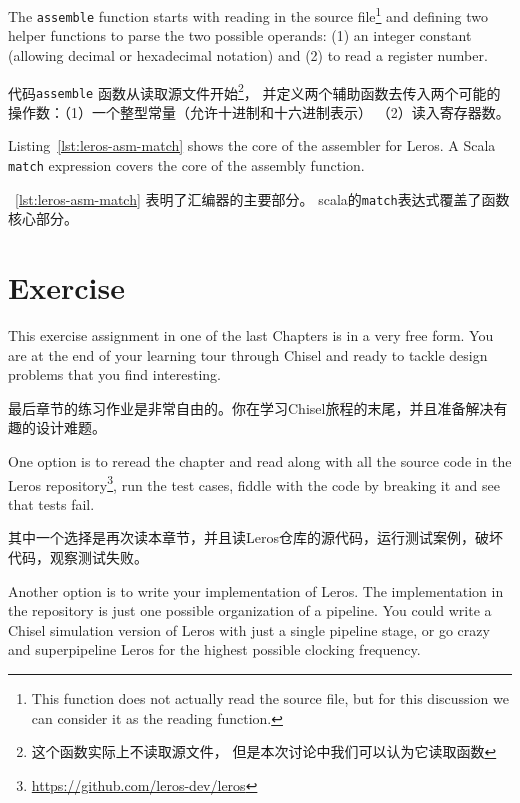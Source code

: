\documentclass[%
    10pt,
    headinclude, footexclude,
    openright, %
    notitlepage,
    cleardoubleempty,
    headsepline,
    pointlessnumbers,
    bibtotoc, idxtotoc,
    ]{scrbook}
\newcommand{\code}[1]{{\small{\texttt{#1}}}}
\newcommand{\todo}[1]{{\emph{TODO: #1}}}
\newcommand{\myref}[2]{\href{#1}{#2}}
\renewcommand{\myref}[2]{{#2}{\footnote{\url{#1}}}}
\renewcommand{\todo}[1]{}
\begin{document}
{The \code{assemble} function starts with reading in the source
file\footnote{This function does not actually read the source file, but for this
discussion we can consider it as the reading function.}
and defining two helper functions to parse the two possible operands: (1) an
integer constant (allowing decimal or hexadecimal notation) and (2) to read
a register number.

代码\code{assemble} 函数从读取源文件开始\footnote{这个函数实际上不读取源文件，
但是本次讨论中我们可以认为它读取函数}，
并定义两个辅助函数去传入两个可能的操作数：（1）一个整型常量（允许十进制和十六进制表示）
（2）读入寄存器数。


Listing~\ref{lst:leros-asm-match} shows the core of the assembler for Leros.
A Scala \code{match} expression covers the core of the assembly function.
\todo{Some more words on the code.}

~\ref{lst:leros-asm-match} 表明了汇编器的主要部分。
scala的\code{match}表达式覆盖了函数核心部分。


\section{Exercise}

This exercise assignment in one of the last Chapters is in a very free form. You are at the end
of your learning tour through Chisel and ready to tackle design problems that
you find interesting.

最后章节的练习作业是非常自由的。你在学习Chisel旅程的末尾，并且准备解决有趣的设计难题。

One option is to reread the chapter and read along with all the source code in the
\myref{https://github.com/leros-dev/leros}{Leros repository}, run the test cases,
fiddle with the code by breaking it and see that tests fail.

其中一个选择是再次读本章节，并且读Leros仓库的源代码，运行测试案例，破坏代码，观察测试失败。

Another option is to write your implementation of Leros.
The implementation in the repository is just one possible organization of a pipeline.
You could write a Chisel simulation version of Leros with just a single pipeline stage,
or go crazy and superpipeline Leros for the highest possible clocking frequency.

}
\end{document}

